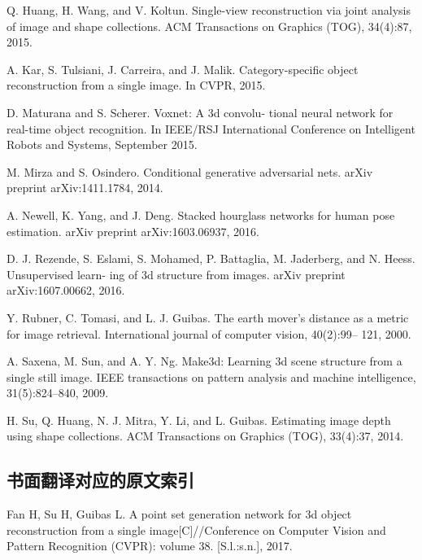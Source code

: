 \begin{translationbib}
	\item Q. Huang, H. Wang, and V. Koltun. Single-view reconstruction via joint analysis of image and shape collections. ACM Transactions on Graphics (TOG), 34(4):87, 2015.
	\item A. Kar, S. Tulsiani, J. Carreira, and J. Malik. Category-specific object reconstruction from a single image. In CVPR, 2015.
	\item D. Maturana and S. Scherer. Voxnet: A 3d convolu- tional neural network for real-time object recognition. In IEEE/RSJ International Conference on Intelligent Robots and Systems, September 2015.
	\item M. Mirza and S. Osindero. Conditional generative adversarial nets. arXiv preprint arXiv:1411.1784, 2014.
	\item A. Newell, K. Yang, and J. Deng. Stacked hourglass networks for human pose estimation. arXiv preprint arXiv:1603.06937, 2016.
	\item D. J. Rezende, S. Eslami, S. Mohamed, P. Battaglia, M. Jaderberg, and N. Heess. Unsupervised learn- ing of 3d structure from images. arXiv preprint arXiv:1607.00662, 2016.
	\item Y. Rubner, C. Tomasi, and L. J. Guibas. The earth mover’s distance as a metric for image retrieval. International journal of computer vision, 40(2):99– 121, 2000.
	\item A. Saxena, M. Sun, and A. Y. Ng. Make3d: Learning 3d scene structure from a single still image. IEEE transactions on pattern analysis and machine intelligence, 31(5):824–840, 2009.
	\item H. Su, Q. Huang, N. J. Mitra, Y. Li, and L. Guibas. Estimating image depth using shape collections. ACM Transactions on Graphics (TOG), 33(4):37, 2014.
\end{translationbib}










\begin{center}
	\section*{{\songti \xiaosi 书面翻译对应的原文索引}}
\end{center}

{
	\wuhao \noindent
	Fan H, Su H, Guibas L. A point set generation network for 3d object reconstruction from a single image[C]//\allowbreak{}Conference on Computer Vision and Pattern Recognition (CVPR): volume 38. [S.l.:s.n.], 2017.
}